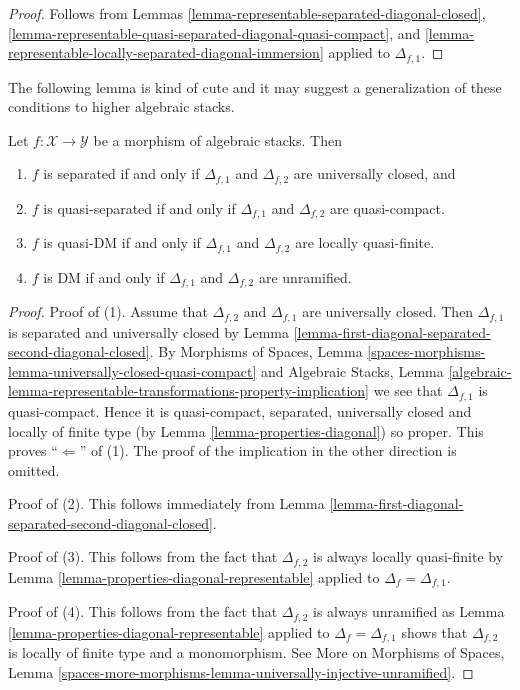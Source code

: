\begin{proof}
Follows from
Lemmas \ref{lemma-representable-separated-diagonal-closed},
\ref{lemma-representable-quasi-separated-diagonal-quasi-compact}, and
\ref{lemma-representable-locally-separated-diagonal-immersion}
applied to $\Delta_{f, 1}$.
\end{proof}

\noindent
The following lemma is kind of cute and it may suggest a generalization
of these conditions to higher algebraic stacks.

\begin{lemma}
\label{lemma-definition-separated}
Let $f : \mathcal{X} \to \mathcal{Y}$ be a morphism of algebraic stacks.
Then
\begin{enumerate}
\item $f$ is separated if and only if $\Delta_{f, 1}$ and $\Delta_{f, 2}$
are universally closed, and
\item $f$ is quasi-separated if and only if $\Delta_{f, 1}$ and $\Delta_{f, 2}$
are quasi-compact.
\item $f$ is quasi-DM if and only if $\Delta_{f, 1}$ and $\Delta_{f, 2}$
are locally quasi-finite.
\item $f$ is DM if and only if $\Delta_{f, 1}$ and $\Delta_{f, 2}$
are unramified.
\end{enumerate}
\end{lemma}

\begin{proof}
Proof of (1). Assume that $\Delta_{f, 2}$ and $\Delta_{f, 1}$ are
universally closed. Then $\Delta_{f, 1}$ is separated and universally
closed by
Lemma \ref{lemma-first-diagonal-separated-second-diagonal-closed}.
By
Morphisms of Spaces,
Lemma \ref{spaces-morphisms-lemma-universally-closed-quasi-compact}
and
Algebraic Stacks,
Lemma \ref{algebraic-lemma-representable-transformations-property-implication}
we see that $\Delta_{f, 1}$ is quasi-compact.
Hence it is quasi-compact, separated, universally closed and locally of
finite type (by
Lemma \ref{lemma-properties-diagonal})
so proper. This proves ``$\Leftarrow$'' of (1).
The proof of the implication in the other direction is omitted.

\medskip\noindent
Proof of (2). This follows immediately from
Lemma \ref{lemma-first-diagonal-separated-second-diagonal-closed}.

\medskip\noindent
Proof of (3). This follows from the fact that $\Delta_{f, 2}$ is always locally
quasi-finite by
Lemma \ref{lemma-properties-diagonal-representable}
applied to $\Delta_f = \Delta_{f, 1}$.

\medskip\noindent
Proof of (4). This follows from the fact that $\Delta_{f, 2}$ is always
unramified as
Lemma \ref{lemma-properties-diagonal-representable}
applied to $\Delta_f = \Delta_{f, 1}$ shows that
$\Delta_{f, 2}$ is locally of finite type and a monomorphism.
See
More on Morphisms of Spaces,
Lemma \ref{spaces-more-morphisms-lemma-universally-injective-unramified}.
\end{proof}










